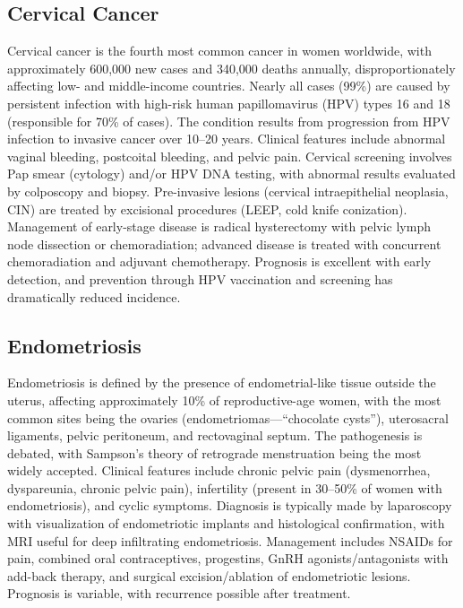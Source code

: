 \subsection{Cervical Cancer}
\label{sec:Cervical Cancer}
Cervical cancer is the fourth most common cancer in women worldwide, with approximately 600,000 new cases and 340,000 deaths annually, disproportionately affecting low- and middle-income countries. Nearly all cases (99\%) are caused by persistent infection with high-risk human papillomavirus (HPV) types 16 and 18 (responsible for 70\% of cases). The condition results from progression from HPV infection to invasive cancer over 10--20 years. Clinical features include abnormal vaginal bleeding, postcoital bleeding, and pelvic pain. Cervical screening involves Pap smear (cytology) and/or HPV DNA testing, with abnormal results evaluated by colposcopy and biopsy. Pre-invasive lesions (cervical intraepithelial neoplasia, CIN) are treated by excisional procedures (LEEP, cold knife conization). Management of early-stage disease is radical hysterectomy with pelvic lymph node dissection or chemoradiation; advanced disease is treated with concurrent chemoradiation and adjuvant chemotherapy. Prognosis is excellent with early detection, and prevention through HPV vaccination and screening has dramatically reduced incidence.

\subsection{Endometriosis}
\label{sec:Endometriosis}
Endometriosis is defined by the presence of endometrial-like tissue outside the uterus, affecting approximately 10\% of reproductive-age women, with the most common sites being the ovaries (endometriomas---``chocolate cysts''), uterosacral ligaments, pelvic peritoneum, and rectovaginal septum. The pathogenesis is debated, with Sampson's theory of retrograde menstruation being the most widely accepted. Clinical features include chronic pelvic pain (dysmenorrhea, dyspareunia, chronic pelvic pain), infertility (present in 30--50\% of women with endometriosis), and cyclic symptoms. Diagnosis is typically made by laparoscopy with visualization of endometriotic implants and histological confirmation, with MRI useful for deep infiltrating endometriosis. Management includes NSAIDs for pain, combined oral contraceptives, progestins, GnRH agonists/antagonists with add-back therapy, and surgical excision/ablation of endometriotic lesions. Prognosis is variable, with recurrence possible after treatment.

